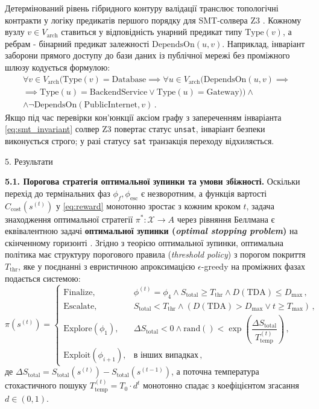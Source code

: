 \documentclass[12pt, reqno, a4paper]{amsart}
\theoremstyle{definition}
\theoremstyle{plain}
\theoremstyle{plain}
\theoremstyle{plain}
\theoremstyle{remark}
\theoremstyle{plain}
\begin{document}
{Детермінований рівень гібридного контуру валідації транслює топологічні контракти у логіку предикатів першого порядку для SMT-солвера Z3 \cite{bib19}. Кожному вузлу $v \in V_{\text{arch}}$ ставиться у відповідність унарний предикат типу $\text{Type}(v)$, а ребрам - бінарний предикат залежності $\text{DependsOn}(u, v)$. Наприклад, інваріант заборони прямого доступу до бази даних із публічної мережі без проміжного шлюзу кодується формулою:
\begin{eqnarray}
\label{eq:smt_invariant}
\forall v \in V_{\text{arch}} \Big( \text{Type}(v) = \text{Database} \implies \forall u \in V_{\text{arch}} \big( \text{DependsOn}(u, v) \implies \nonumber \\
\implies \text{Type}(u) = \text{BackendService} \lor \text{Type}(u) = \text{Gateway} \big) \Big) \land \nonumber \\
\land \neg \text{DependsOn}(\text{PublicInternet}, v)\, .
\end{eqnarray}
Якщо під час перевірки кон'юнкції аксіом графу з запереченням інваріанта \eqref{eq:smt_invariant} солвер Z3 повертає статус \texttt{unsat}, інваріант безпеки виконується строго; у разі статусу \texttt{sat} транзакція переходу відхиляється.

\begin{Head}
5. Результати
\end{Head}

\textbf{5.1. Порогова стратегія оптимальної зупинки та умови збіжності.} Оскільки перехід до термінальних фаз $\phi_f, \phi_{\text{esc}}$ є незворотним, а функція вартості $C_{\text{cost}}(s^{(t)})$ у \eqref{eq:reward} монотонно зростає з кожним кроком $t$, задача знаходження оптимальної стратегії $\pi^*: \mathcal{X} \to A$ через рівняння Беллмана є еквівалентною задачі \textbf{оптимальної зупинки (\textit{optimal stopping problem})} на скінченному горизонті \cite{bib23}. Згідно з теорією оптимальної зупинки, оптимальна політика має структуру порогового правила (\textit{threshold policy}) з порогом покриття $T_{\text{thr}}$, яке у поєднанні з евристичною апроксимацією $\epsilon$-greedy на проміжних фазах подається системою:
\begin{equation}
\label{eq:policy}
\pi(s^{(t)}) = \left\{
\begin{array}{ll}
\text{Finalize}, & \phi^{(t)} = \phi_4 \land S_{\text{total}} \ge T_{\text{thr}} \land D(\text{TDA}) \le D_{\max}\, , \\
\text{Escalate}, & S_{\text{total}} < T_{\text{thr}} \land \left(D(\text{TDA}) > D_{\max} \lor t \ge T_{\max}\right)\, , \\
\text{Explore}(\phi_1), & \Delta S_{\text{total}} < 0 \land \text{rand}() < \exp\left(\dfrac{\Delta S_{\text{total}}}{T_{\text{temp}}^{(t)}}\right)\, , \\
\text{Exploit}(\phi_{i+1}), & \mbox{в інших випадках}\, ,
\end{array}
\right.
\end{equation}
де $\Delta S_{\text{total}} = S_{\text{total}}(s^{(t)}) - S_{\text{total}}(s^{(t-1)})$, а поточна температура стохастичного пошуку $T_{\text{temp}}^{(t)} = T_0 \cdot d^t$ монотонно спадає з коефіцієнтом згасання $d \in (0, 1)$.

}
\end{document}
